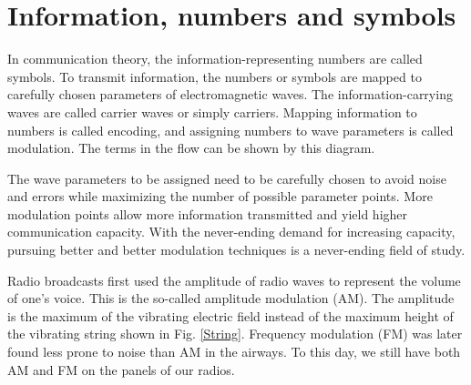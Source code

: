 \documentclass[oneside, letter, 12pt]{book}
\begin{document}
\section{Information, numbers and symbols}
In communication theory, the information-representing numbers are called symbols. To transmit information, the numbers or symbols are mapped to carefully chosen parameters of electromagnetic waves. The information-carrying waves are called carrier waves or simply carriers. Mapping information to numbers is called encoding, and assigning numbers to wave parameters is called modulation. The terms in the flow can be shown by this diagram.

The wave parameters to be assigned need to be carefully chosen to avoid noise and errors while maximizing the number of possible parameter points. More modulation points allow more information transmitted and yield higher communication capacity. With the never-ending demand for increasing capacity, pursuing better and better modulation techniques is a never-ending field of study.

Radio broadcasts first used the amplitude of radio waves to represent the volume of one's voice. This is the so-called amplitude modulation (AM). The amplitude is the maximum of the vibrating electric field instead of the maximum height of the vibrating string shown in Fig. \ref{String}. Frequency modulation (FM) was later found less prone to noise than AM in the airways. To this day, we still have both AM and FM on the panels of our radios.
\end{document}
